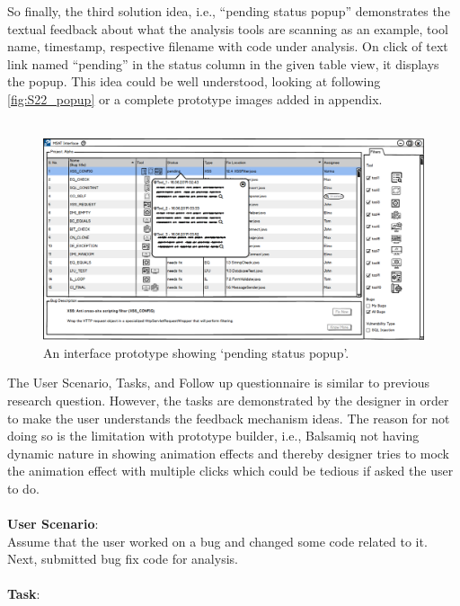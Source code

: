 So finally, the third solution idea, i.e., “pending status popup” demonstrates the textual feedback about what the analysis tools are scanning as an example, tool name, timestamp, respective filename with code under analysis. On click of text link named “pending” in the status column in the given table view, it displays the popup. This idea could be well understood, looking at following \autoref{fig:S22_popup} or a complete prototype images added in appendix. \\ \\


\begin{figure}[hbt!]
	\centering
	\includegraphics[width=\linewidth]{figures/solution_ideas_snaps/S22_popup}
	\caption{An interface prototype showing ‘pending status popup’.}
	\label{fig:S22_popup}
\end{figure}

The User Scenario, Tasks, and Follow up questionnaire is similar to previous research question. However, the tasks are demonstrated by the designer in order to make the user understands the feedback mechanism ideas. The reason for not doing so is the limitation with prototype builder, i.e., Balsamiq not having dynamic nature in showing animation effects and thereby designer tries to mock the animation effect with multiple clicks which could be tedious if asked the user to do. \\ \\

\textbf{User Scenario}: \\

Assume that the user worked on a bug and changed some code related to it. Next, submitted bug fix code for analysis. \\ \\

\textbf{Task}: \\

